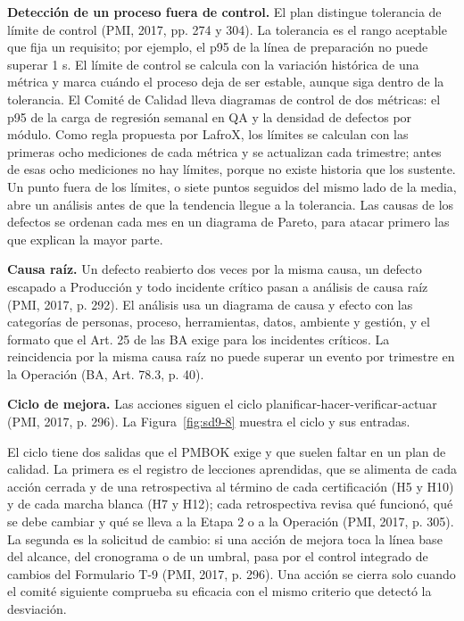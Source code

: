 \textbf{Detección de un proceso fuera de control.} El plan distingue tolerancia de límite de control (PMI, 2017, pp. 274 y 304). La tolerancia es el rango aceptable que fija un requisito; por ejemplo, el p95 de la línea de preparación no puede superar 1 s. El límite de control se calcula con la variación histórica de una métrica y marca cuándo el proceso deja de ser estable, aunque siga dentro de la tolerancia. El Comité de Calidad lleva diagramas de control de dos métricas: el p95 de la carga de regresión semanal en QA y la densidad de defectos por módulo. Como regla propuesta por LafroX, los límites se calculan con las primeras ocho mediciones de cada métrica y se actualizan cada trimestre; antes de esas ocho mediciones no hay límites, porque no existe historia que los sustente. Un punto fuera de los límites, o siete puntos seguidos del mismo lado de la media, abre un análisis antes de que la tendencia llegue a la tolerancia. Las causas de los defectos se ordenan cada mes en un diagrama de Pareto, para atacar primero las que explican la mayor parte.

\textbf{Causa raíz.} Un defecto reabierto dos veces por la misma causa, un defecto escapado a Producción y todo incidente crítico pasan a análisis de causa raíz (PMI, 2017, p. 292). El análisis usa un diagrama de causa y efecto con las categorías de personas, proceso, herramientas, datos, ambiente y gestión, y el formato que el Art. 25 de las BA exige para los incidentes críticos. La reincidencia por la misma causa raíz no puede superar un evento por trimestre en la Operación (BA, Art. 78.3, p. 40).

\textbf{Ciclo de mejora.} Las acciones siguen el ciclo planificar-hacer-verificar-actuar (PMI, 2017, p. 296). La Figura~\ref{fig:sd9-8} muestra el ciclo y sus entradas.


El ciclo tiene dos salidas que el PMBOK exige y que suelen faltar en un plan de calidad. La primera es el registro de lecciones aprendidas, que se alimenta de cada acción cerrada y de una retrospectiva al término de cada certificación (H5 y H10) y de cada marcha blanca (H7 y H12); cada retrospectiva revisa qué funcionó, qué se debe cambiar y qué se lleva a la Etapa 2 o a la Operación (PMI, 2017, p. 305). La segunda es la solicitud de cambio: si una acción de mejora toca la línea base del alcance, del cronograma o de un umbral, pasa por el control integrado de cambios del Formulario T-9 (PMI, 2017, p. 296). Una acción se cierra solo cuando el comité siguiente comprueba su eficacia con el mismo criterio que detectó la desviación.

